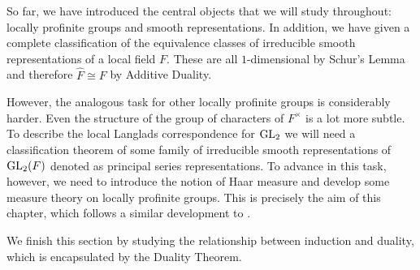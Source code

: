 So far, we have introduced the central objects that we will study throughout: locally profinite groups and smooth representations. In addition, we have given a complete classification of the equivalence classes of irreducible smooth representations of a local field $F$. These are all $1$-dimensional by Schur's Lemma and therefore $\hat{F}\cong F$ by Additive Duality. 

However, the analogous task for other locally profinite groups is considerably harder. Even the structure of the group of characters of $F^{\times}$ is a lot more subtle. To describe the local Langlads correspondence for $\mathrm{GL}_2$ we will need a classification theorem of some family of irreducible smooth representations of $\mathrm{GL}_2(F)$ denoted as principal series representations. To advance in this task, however, we need to introduce the notion of Haar measure and develop some measure theory on locally profinite groups. This is precisely the aim of this chapter, which follows a similar development to \cite[Chapter 3]{BH1}.

We finish this section by studying the relationship between induction and duality, which is encapsulated by the Duality Theorem.




\newpage